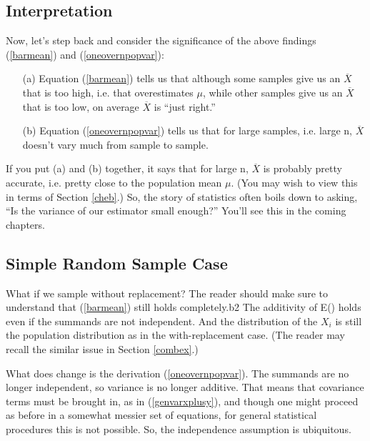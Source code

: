 \subsection{Interpretation}

Now, let's step back and consider the significance of the above
findings (\ref{barmean}) and (\ref{oneovernpopvar}):

\begin{itemize}

\item [(a)] Equation (\ref{barmean}) tells us that although some samples give
us an $\overline{X}$ that is too high, i.e. that overestimates $\mu$,
while other samples give us an $\overline{X}$ that is too low, on
average $\overline{X}$ is ``just right.''

\item [(b)] Equation (\ref{oneovernpopvar}) tells us that for large samples,
i.e. large n, $\overline{X}$ doesn't vary much from sample to sample.

\end{itemize}

If you put (a) and (b) together, it says that for large n,
$\overline{X}$ is probably pretty accurate, i.e. pretty close to the
population mean $\mu$.  (You may wish to view this in terms of Section
\ref{cheb}.)  So, the story of statistics often boils down to asking,
``Is the variance of our estimator small enough?''  You'll see this in
the coming chapters.

\subsection{Simple Random Sample Case}

What if we sample without replacement?  The reader should make sure to
understand that (\ref{barmean}) still holds completely.b2  The additivity
of E() holds even if the summands are not independent.  And the
distribution of the $X_i$ is still the population distribution as in the
with-replacement case.  (The reader may recall the similar issue in
Section \ref{combex}.)

What does change is the derivation (\ref{oneovernpopvar}).  The summands
are no longer independent, so variance is no longer additive.  That
means that covariance terms must be brought in, as in 
(\ref{genvarxplusy}), and though one might proceed as before in a
somewhat messier set of equations, for general statistical procedures
this is not possible.  So, the independence assumption is ubiquitous.


